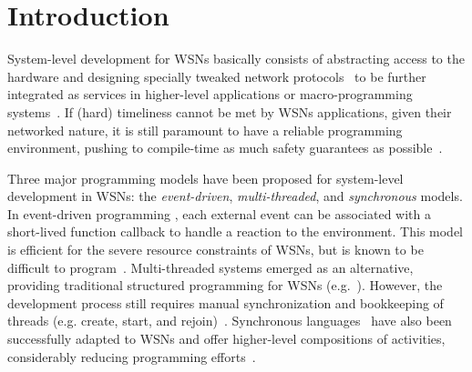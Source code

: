 \documentclass[10pt]{sensys-proc}
\begin{document}

\section{Introduction}
\label{sec.intro}

\begin{comment}
TODO
Wireless sensor networks (WSNs) are composed of a large number of tiny devices 
(known as ``motes'') capable of sensing the environment and communicating among 
them.
WSNs are usually employed to continuously monitor physical phenomena in large 
or unreachable areas, such as wildfire in forests and air temperature in 
buildings.
Each mote features limited processing capabilities, a short-range radio link, 
and one or more sensors (e.g. light and temperature) \cite{wsn.survey}.

Applications developed for wireless sensor networks (WSNs) typically perform a 
succession of sensing, processing, actuating, and communicating.
This process involves an external environment, which concurrently interacts 
with the application by issuing events that represent expiring timers, messages 
arrivals, sensor readings, etc.
\end{comment}

System-level development for WSNs basically consists of abstracting access to 
the hardware and designing specially tweaked network 
protocols~\cite{wsn.tos,wsn.survey} to be further integrated as services in 
higher-level applications or macro-programming systems~\cite{wsn.state_of_art}.
If (hard) timeliness cannot be met by WSNs applications, given their networked 
nature, it is still paramount to have a reliable programming environment, 
pushing to compile-time as much safety guarantees as 
possible~\cite{wsn.decade}.

Three major programming models have been proposed for system-level development 
in WSNs: the \emph{event-driven}, \emph{multi-threaded}, and \emph{synchronous} 
models.
%
In event-driven programming \cite{wsn.tos,wsn.contiki}, each external event can 
be associated with a short-lived function callback to handle a reaction to the 
environment.
This model is efficient for the severe resource constraints of WSNs, but is 
known to be difficult to 
program~\cite{sync_async.cooperative,wsn.protothreads}.
%
Multi-threaded systems emerged as an alternative, providing traditional 
structured programming for WSNs (e.g.~\cite{wsn.protothreads,wsn.mantisos}).
However, the development process still requires manual synchronization and 
bookkeeping of threads (e.g. create, start, and 
rejoin)~\cite{sync_async.threadsproblems}.
%
Synchronous languages~\cite{rp.twelve} have also been successfully adapted to 
WSNs and offer higher-level compositions of activities, considerably reducing 
programming efforts~\cite{wsn.sol,wsn.osm}.
\end{document}
